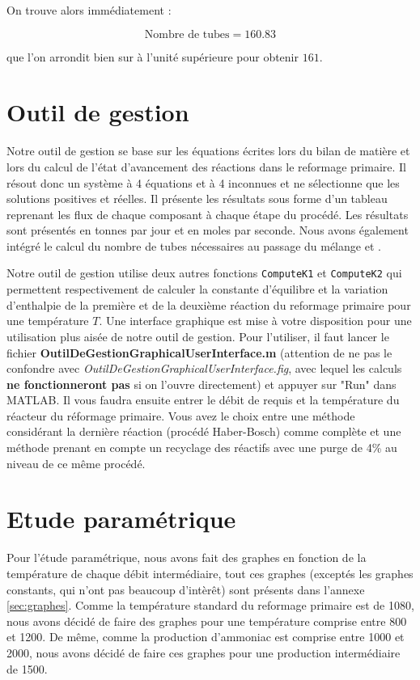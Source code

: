 On trouve alors immédiatement :

$$\text{Nombre de tubes} = 160.83$$

que l'on arrondit bien sur à l'unité supérieure pour obtenir $161$.

\section{Outil de gestion}
Notre outil de gestion se base sur les équations écrites lors du
bilan de matière et lors du calcul de l'état d'avancement des réactions
dans le reformage primaire. Il résout donc un système à 4 équations
et à 4 inconnues et ne sélectionne que les solutions positives et réelles.
Il présente les résultats sous forme d'un tableau reprenant les flux de chaque
composant à chaque étape du procédé. Les résultats sont présentés en tonnes par jour
et en moles par seconde.
Nous avons également intégré le calcul du nombre de tubes nécessaires au
passage du mélange  et .

Notre outil de gestion utilise deux autres fonctions \lstinline{ComputeK1}
et \lstinline{ComputeK2} qui permettent respectivement de calculer la constante
d'équilibre et la variation d'enthalpie de la première et de la deuxième
réaction du reformage primaire pour une température $T$.
Une interface graphique est mise à votre disposition pour une utilisation plus aisée de notre outil de gestion.
Pour l'utiliser, il faut lancer le fichier \textbf{OutilDeGestionGraphicalUserInterface.m}
(attention de ne pas le confondre avec \textit{OutilDeGestionGraphicalUserInterface.fig},
avec lequel les calculs \textbf{ne fonctionneront pas} si on l'ouvre directement) et appuyer sur "Run" dans \textsc{MATLAB}.
Il vous faudra ensuite entrer le débit de  requis et la température du réacteur du réformage primaire. 
Vous avez le choix entre une méthode considérant la dernière réaction (procédé Haber-Bosch) comme
complète et une méthode prenant en compte un recyclage des réactifs avec une purge de 4\% au niveau de ce même procédé.   

\section{Etude paramétrique}
Pour l'étude paramétrique, nous avons fait des
graphes en fonction de la température de chaque
débit intermédiaire, tout ces graphes (exceptés
les graphes constants, qui n'ont pas beaucoup
d'intèrêt) sont présents dans l'annexe 
\ref{sec:graphes}. Comme la température
standard du reformage primaire est de 
\unit{1080}{\kelvin}, nous avons décidé
de faire des graphes pour une température
comprise entre 800 et \unit{1200}{\kelvin}.
De même, comme la production d'ammoniac
est comprise entre 1000 et \unit{2000}{\ton\per\dday},
nous avons décidé de faire ces graphes pour
une production intermédiaire de 
\unit{1500}{\ton\per\dday}.

